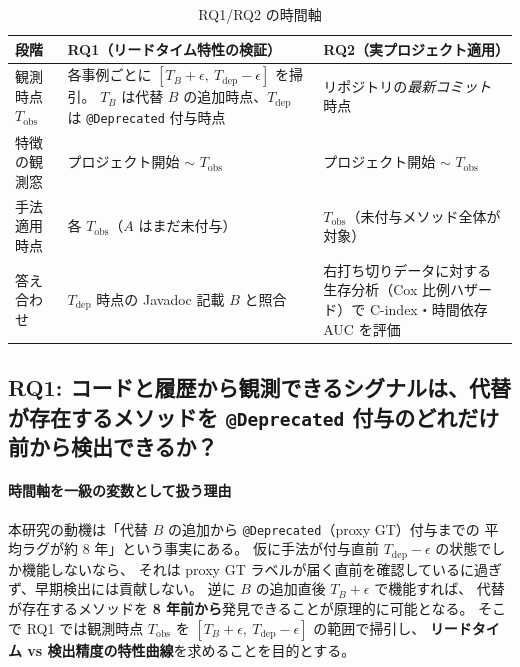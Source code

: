 \documentclass[a4paper,12pt]{article}
\begin{document}
\begin{table}[h]
\centering
\small
\begin{tabular}{|p{3.0cm}|p{5.6cm}|p{5.0cm}|}
  \hline
  \textbf{段階} & \textbf{RQ1（リードタイム特性の検証）} & \textbf{RQ2（実プロジェクト適用）} \\
  \hline
  観測時点 $T_{\text{obs}}$ &
  各事例ごとに $[T_B + \epsilon,\ T_{\text{dep}} - \epsilon]$ を掃引。
  $T_B$ は代替 $B$ の追加時点、$T_{\text{dep}}$ は \texttt{@Deprecated} 付与時点 &
  リポジトリの\emph{最新コミット}時点 \\
  \hline
  特徴の観測窓 & プロジェクト開始 $\sim$ $T_{\text{obs}}$ & プロジェクト開始 $\sim$ $T_{\text{obs}}$ \\
  \hline
  手法適用時点 & 各 $T_{\text{obs}}$（$A$ はまだ未付与） & $T_{\text{obs}}$（未付与メソッド全体が対象） \\
  \hline
  答え合わせ & $T_{\text{dep}}$ 時点の Javadoc 記載 $B$ と照合 & 右打ち切りデータに対する生存分析（Cox 比例ハザード）で C-index・時間依存 AUC を評価 \\
  \hline
\end{tabular}
\caption{RQ1/RQ2 の時間軸}
\label{tab:rq-timeline}
\end{table}

\subsection{RQ1: コードと履歴から観測できるシグナルは、代替が存在するメソッドを
\texttt{@Deprecated} 付与のどれだけ前から検出できるか？}

\paragraph{時間軸を一級の変数として扱う理由}
本研究の動機は「代替 $B$ の追加から \texttt{@Deprecated}（proxy GT）付与までの
平均ラグが約 8 年」という事実にある。
仮に手法が付与直前 $T_{\text{dep}} - \epsilon$ の状態でしか機能しないなら、
それは proxy GT ラベルが届く直前を確認しているに過ぎず、早期検出には貢献しない。
逆に $B$ の追加直後 $T_B + \epsilon$ で機能すれば、
代替が存在するメソッドを \textbf{8 年前から}発見できることが原理的に可能となる。
そこで RQ1 では観測時点 $T_{\text{obs}}$ を $[T_B+\epsilon,\ T_{\text{dep}}-\epsilon]$ の範囲で掃引し、
\textbf{リードタイム vs 検出精度の特性曲線}を求めることを目的とする。
\end{document}
